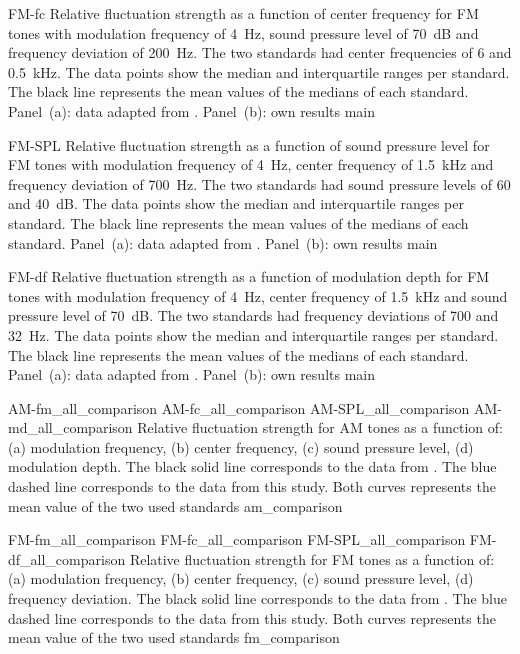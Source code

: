 \documentclass[../main.tex]{subfiles}
\begin{document}
\begin{experimentalresults}
\myfigurefastlexpstds%
  {FM-fc}
  {Relative fluctuation strength as a function of center frequency for
    \gls{FM} tones with modulation frequency of 4~Hz, sound pressure level of
    70~dB and frequency deviation of 200~Hz.  The two standards had center
    frequencies of 6 and 0.5~kHz. The data points show the median and
    interquartile ranges per standard. The black line represents the mean values
    of the medians of each standard. Panel~(a): data adapted from
    \cite[pp.250]{Fastl2007Psychoacoustics}. Panel~(b): own results}
  {main}

\myfigurefastlexpstds%
  {FM-SPL}
  {Relative fluctuation strength as a function of sound pressure level for
    \gls{FM} tones with modulation frequency of 4~Hz, center frequency of
    1.5~kHz and frequency deviation of 700~Hz.  The two standards had sound
    pressure levels of 60 and 40~dB. The data points show the median and
    interquartile ranges per standard. The black line represents the mean values
    of the medians of each standard. Panel~(a): data adapted from
    \cite[pp.249]{Fastl2007Psychoacoustics}. Panel~(b): own results}
  {main}

\myfigurefastlexpstds%
  {FM-df}
  {Relative fluctuation strength as a function of modulation depth for
    \gls{FM} tones with modulation frequency of 4~Hz, center frequency of
    1.5~kHz and sound pressure level of 70~dB.  The two standards had frequency
    deviations of 700 and 32~Hz. The data points show the median and
    interquartile ranges per standard. The black line represents the mean values
    of the medians of each standard. Panel~(a): data adapted from
    \cite[pp.251]{Fastl2007Psychoacoustics}. Panel~(b): own results}
  {main}

\myfigurequadlabeled%
  {AM-fm_all_comparison}
  {AM-fc_all_comparison}
  {AM-SPL_all_comparison}
  {AM-md_all_comparison}
  {Relative fluctuation strength for AM tones as a function of: (a) modulation
    frequency, (b) center frequency, (c) sound pressure level, (d) modulation
    depth. The black solid line corresponds to the data from
    \textcite{Fastl2007Psychoacoustics}. The blue dashed line corresponds to the
    data from this study. Both curves represents the mean value of the two used
    standards}
  {am_comparison}

\myfigurequadlabeled%
  {FM-fm_all_comparison}
  {FM-fc_all_comparison}
  {FM-SPL_all_comparison}
  {FM-df_all_comparison}
  {Relative fluctuation strength for FM tones as a function of: (a) modulation
    frequency, (b) center frequency, (c) sound pressure level, (d) frequency
    deviation. The black solid line corresponds to the data from
    \textcite{Fastl2007Psychoacoustics}. The blue dashed line corresponds to the
    data from this study. Both curves represents the mean value of the two used
    standards}
  {fm_comparison}

\end{experimentalresults}
\end{document}
